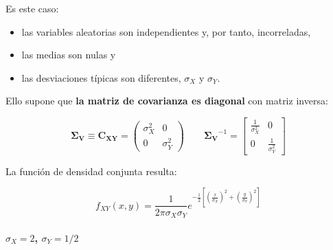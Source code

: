 \documentclass[11pt]{article}
\providecommand{\tightlist}{%
      \setlength{\itemsep}{0pt}\setlength{\parskip}{0pt}}
\begin{document}
Es este caso:

\begin{itemize}
\tightlist
\item
  las variables aleatorias son independientes y, por tanto,
  incorreladas,
\item
  las medias son nulas y
\item
  las desviaciones típicas son diferentes, \(\sigma_X\) y \(\sigma_Y\).
\end{itemize}

Ello supone que \textbf{la matriz de covarianza es diagonal} con matriz
inversa:

\[\boldsymbol{\Sigma_V}\equiv \mathbf{C_{XY}} = 
 \begin{pmatrix}
\sigma_X^2 & 0\\
0 & \sigma_Y^2
\end{pmatrix} \qquad
\boldsymbol{\Sigma_V}^{-1}=\left[ \begin{array}{cc}{\frac{1}{\sigma_{X}^{2}}} & {0} \\ {0} & {\frac{1}{\sigma_{Y}^{2}}}\end{array}\right]
\]

La función de densidad conjunta resulta:

\[
f_{XY}(x, y)= \frac{1}{2 \pi\sigma_X\sigma_Y} e^{-\frac{1}{2}\left[(\frac{x}{\sigma_X})^2 + (\frac{y}{\sigma_Y})^2 \right]}
\]

    \hypertarget{sigma_x-2-sigma_y-12}{%
\paragraph{\texorpdfstring{\(\sigma_X = 2\),
\(\sigma_Y = 1/2\)}{\textbackslash{}sigma\_X = 2, \textbackslash{}sigma\_Y = 1/2}}\label{sigma_x-2-sigma_y-12}}

    \begin{center}
    \end{center}
    { \hspace*{\fill} \\}
    
    \begin{center}
    \end{center}
    { \hspace*{\fill} \\}
    
\end{document}
